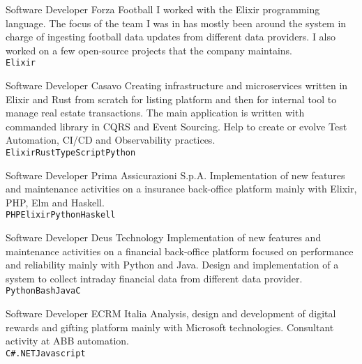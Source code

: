 \documentclass[9pt]{developercv}
\begin{document}
\begin{entrylist}
		{Software Developer}
		{Forza Football}
		{I worked with the Elixir programming language. The focus of the team I was in has mostly been around the system in charge of ingesting football data updates from different data
	   providers. I also worked on a few open-source projects that the company maintains.\\
	   \texttt{Elixir}}

		{Software Developer}
		{Casavo}
		{Creating infrastructure and microservices written in Elixir and Rust from scratch for listing platform and then for internal tool to manage real estate transactions. The main application is written with commanded library in CQRS and Event Sourcing. Help to create or evolve Test Automation, CI/CD and Observability practices.\\
	   \texttt{Elixir}\slashsep\texttt{Rust}\slashsep\texttt{TypeScript}\slashsep\texttt{Python}}

		{Software Developer}
		{Prima Assicurazioni S.p.A.}
		{Implementation of new features and maintenance activities on a insurance back-office platform mainly with Elixir, PHP, Elm and Haskell. \\ \texttt{PHP}\slashsep\texttt{Elixir}\slashsep\texttt{Python}\slashsep\texttt{Haskell}}

		{Software Developer}
		{Deus Technology}
		{Implementation of new features and maintenance activities on a financial back-office platform focused on performance and reliability mainly with Python and Java. Design and implementation of a system to collect intraday financial data from different data provider. \\ \texttt{Python}\slashsep\texttt{Bash}\slashsep\texttt{Java}\slashsep\texttt{C}}

		{Software Developer}
		{ECRM Italia}
		{Analysis, design and development of digital rewards and gifting platform mainly with Microsoft technologies. Consultant activity at ABB automation. \\
	   \texttt{C\#}\slashsep\texttt{.NET}\slashsep\texttt{Javascript}}


\end{entrylist}
\end{document}
